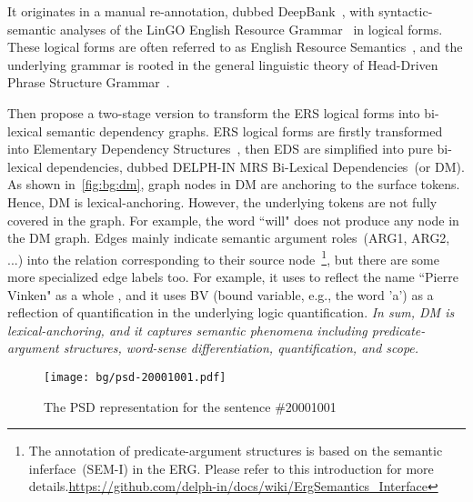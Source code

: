  It
originates in a manual re-annotation, dubbed
DeepBank~\citep{Fli:Kor:Zha:12}, with syntactic-semantic analyses of
the LinGO English Resource Grammar~\citep{Oep:Fli:Tou:04} in logical
forms. These logical forms are often referred to as English Resource
Semantics~\citep[ERS,][]{Ben:Fli:Oep:15}, and the underlying grammar
is rooted in the general linguistic theory of Head-Driven Phrase
Structure Grammar~\citep[HPSG,][]{Pol:Sag:94}.

Then \citet{Iva:Oep:Ovr:12} propose a two-stage version to transform
the ERS logical forms into bi-lexical semantic dependency graphs. ERS
logical forms are firstly transformed into Elementary Dependency
Structures~\cite[EDS,][]{Oep:Lon:06}, then EDS are simplified into
pure bi-lexical dependencies, dubbed DELPH-IN MRS Bi-Lexical
Dependencies~(or DM). As shown in~\autoref{fig:bg:dm}, graph nodes in
DM are anchoring to the surface tokens. Hence, DM is
lexical-anchoring. However, the underlying tokens are not fully
covered in the graph. For example, the word ``will" does not produce
any node in the DM graph. Edges mainly indicate semantic argument
roles~(ARG1, ARG2, ...) into the relation corresponding to their
source node~\footnote{The annotation of predicate-argument structures
  is based on the semantic inferface~(SEM-I) in the ERG. Please refer
  to this introduction for more
  details.\url{https://github.com/delph-in/docs/wiki/ErgSemantics_Interface}},
but there are some more specialized edge labels too. For example, it
uses  to reflect the name ``Pierre Vinken" as a whole ,
and it uses BV (bound variable, e.g., the word 'a') as a reflection of
quantification in the underlying logic quantification. \textit{In sum,
  DM is lexical-anchoring, and it captures semantic phenomena
  including predicate-argument structures, word-sense differentiation,
  quantification, and scope.}

\begin{figure}[!th]
\centering
\texttt{[image: bg/psd-20001001.pdf]}
\caption{\label{fig:bg:psd}The PSD representation for the sentence
  \#20001001}
\end{figure}


